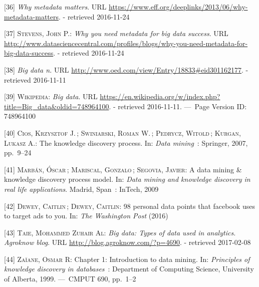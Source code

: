\documentclass[12pt,english,a4paper,titlepage,cleardoublepage=empty,dottedtoc]{report}
\begin{document}
\hypertarget{ref-web_2013_why-metadata-matters}{}
{[}36{]} \emph{Why metadata matters}. URL
\url{https://www.eff.org/deeplinks/2013/06/why-metadata-matters}. -
retrieved 2016-11-24

\hypertarget{ref-web_2016_why-you-need-metadata-for-big-data-to-success}{}
{[}37{]} \textsc{Stevens, John P.}: \emph{Why you need metadata for big
data success}. URL
\url{http://www.datasciencecentral.com/profiles/blogs/why-you-need-metadata-for-big-data-success}.
- retrieved 2016-11-24

\hypertarget{ref-web_2016_oxford_definition_big-data}{}
{[}38{]} \emph{Big data n.} URL
\url{http://www.oed.com/view/Entry/18833\#eid301162177}. - retrieved
2016-11-11

\hypertarget{ref-web_2016_wikipedia_definition_big-data}{}
{[}39{]} \textsc{Wikipedia}: \emph{Big data}. URL
\url{https://en.wikipedia.org/w/index.php?title=Big_data\&oldid=748964100}.
- retrieved 2016-11-11. ---~Page Version ID: 748964100

\hypertarget{ref-chapter_2007_the-knowledge-discovery-process}{}
{[}40{]} \textsc{Cios, Krzysztof J.}\,; \textsc{Swiniarski, Roman W.}\,;
\textsc{Pedrycz, Witold}\,; \textsc{Kurgan, Lukasz A.}: The knowledge
discovery process. In: \emph{Data mining}~: Springer, 2007, pp.~9--24

\hypertarget{ref-paper_2009_a-data-mining-knowledge-discovery-process-model}{}
{[}41{]} \textsc{Marbán, Óscar}\,; \textsc{Mariscal, Gonzalo}\,;
\textsc{Segovia, Javier}: A data mining \& knowledge discovery process
model. In: \emph{Data mining and knowledge discovery in real life
applications}. Madrid, Span~: InTech, 2009

\hypertarget{ref-web_2016_facebook-utilizes-98-data-points}{}
{[}42{]} \textsc{Dewey, Caitlin}\,; \textsc{Dewey, Caitlin}: 98 personal
data points that facebook uses to target ads to you. In: \emph{The
Washington Post} (2016)

\hypertarget{ref-web_2016_big-data-types-of-data-used-in-analytics}{}
{[}43{]} \textsc{Taie, Mohammed Zuhair Al}: \emph{Big data: Types of
data used in analytics. Agroknow blog}. URL
\url{http://blog.agroknow.com/?p=4690}. - retrieved 2017-02-08

\hypertarget{ref-book-chapter_1999_Principles-of-knowledge-discovery-in-databases_introduction-to-data-mining}{}
{[}44{]} \textsc{Zaïane, Osmar R}: Chapter 1: Introduction to data
mining. In: \emph{Principles of knowledge discovery in databases}~:
Department of Computing Science, University of Alberta, 1999. ---~CMPUT
690, pp.~1--2
\end{document}
